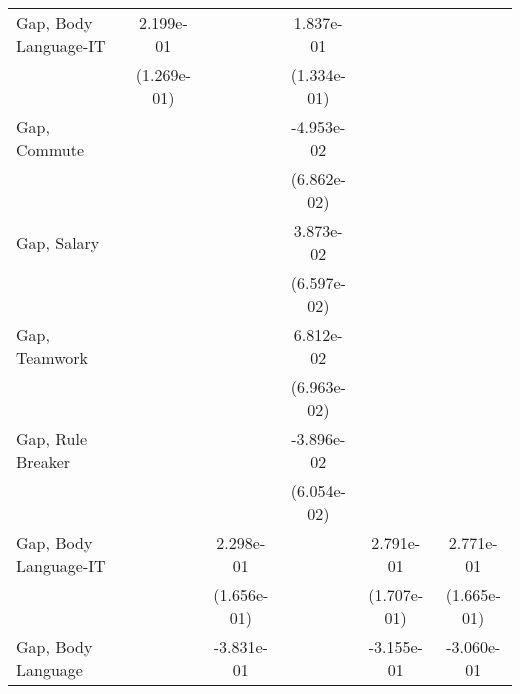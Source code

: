 {\begin{tabular}{l*{5}{c}}
    \addlinespace
    Gap, Body Language-IT     & 2.199e-01\sym{+}      &                       & 1.837e-01             &                       &                             \\
                              & (1.269e-01)           &                       & (1.334e-01)           &                       &                             \\
    \addlinespace
    Gap, Commute              &                       &                       & -4.953e-02            &                       &                             \\
                              &                       &                       & (6.862e-02)           &                       &                             \\
    \addlinespace
    Gap, Salary               &                       &                       & 3.873e-02             &                       &                             \\
                              &                       &                       & (6.597e-02)           &                       &                             \\
    \addlinespace
    Gap, Teamwork             &                       &                       & 6.812e-02             &                       &                             \\
                              &                       &                       & (6.963e-02)           &                       &                             \\
    \addlinespace
    Gap, Rule Breaker         &                       &                       & -3.896e-02            &                       &                             \\
                              &                       &                       & (6.054e-02)           &                       &                             \\
    \addlinespace
    Gap, Body Language-IT     &                       & 2.298e-01             &                       & 2.791e-01             & 2.771e-01\sym{+}            \\
                              &                       & (1.656e-01)           &                       & (1.707e-01)           & (1.665e-01)                 \\
    \addlinespace
    Gap, Body Language        &                       & -3.831e-01\sym{**}    &                       & -3.155e-01\sym{*}     & -3.060e-01\sym{*}           \\

\end{tabular}}
